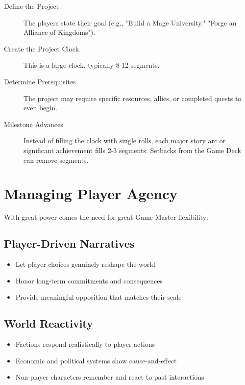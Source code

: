 \begin{description}
    \item[Define the Project] The players state their goal (e.g., "Build a Mage University," "Forge an Alliance of Kingdoms").
    \item[Create the Project Clock] This is a large clock, typically 8-12 segments.
    \item[Determine Prerequisites] The project may require specific resources, allies, or completed quests to even begin.
    \item[Milestone Advances] Instead of filling the clock with single rolls, each major story arc or significant achievement fills 2-3 segments. Setbacks from the Game Deck can remove segments.
\end{description}

\section{Managing Player Agency}

With great power comes the need for great Game Master flexibility:

\subsection*{Player-Driven Narratives}

\begin{itemize}
    \item Let player choices genuinely reshape the world
    \item Honor long-term commitments and consequences
    \item Provide meaningful opposition that matches their scale
\end{itemize}

\subsection*{World Reactivity}

\begin{itemize}
    \item Factions respond realistically to player actions
    \item Economic and political systems show cause-and-effect
    \item Non-player characters remember and react to past interactions
\end{itemize}

